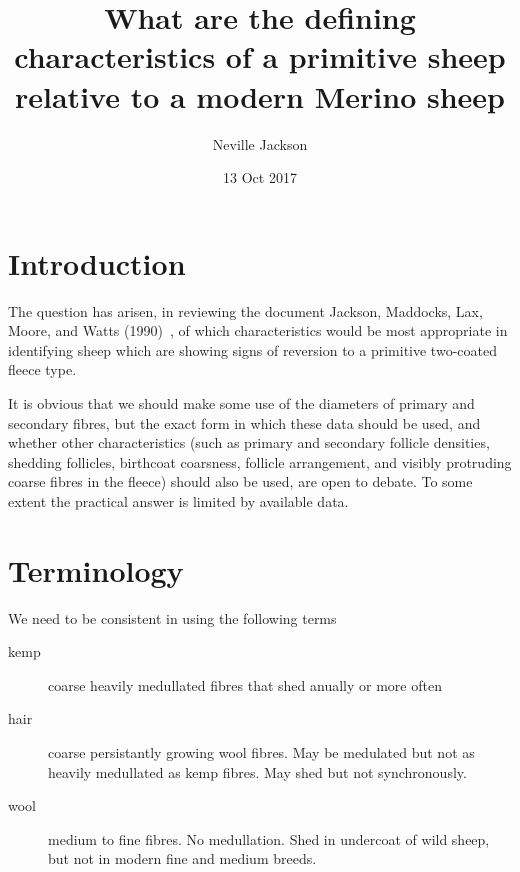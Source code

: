 \documentclass[titlepage]{article}  %
\title{What are the defining characteristics of a primitive sheep relative to a modern Merino sheep}
\author{Neville Jackson}
\date{13 Oct 2017}
\begin{document}
 
 
\maketitle      
\tableofcontents

\clearpage
\section{Introduction} 
The question has arisen, in reviewing the document Jackson, Maddocks, Lax, Moore, and Watts (1990)~\cite{jack:90}, of which characteristics would be most appropriate in identifying sheep which are showing signs of reversion to a primitive two-coated fleece type.

It is obvious that we should make some use of the diameters of primary and secondary fibres, but the exact form in which these data should be used, and whether other characteristics (such as primary and secondary follicle densities, shedding follicles, birthcoat coarsness, follicle arrangement, and visibly protruding coarse fibres in the fleece) should also be used, are open to debate. To some extent the practical answer is limited by available data.

\section{Terminology}
We need to be consistent in using the following terms
\begin{description}
\item[kemp] coarse heavily medullated fibres that shed anually or more often
\item[hair] coarse persistantly growing wool fibres. May be medulated but not as heavily medullated as kemp fibres. May shed but not synchronously.
\item[wool] medium to fine fibres. No medullation. Shed in undercoat of wild sheep, but not in modern fine and medium breeds.
\end{description}
\end{document}
